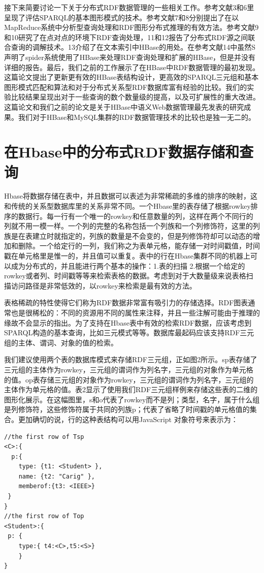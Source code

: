  
  接下来简要讨论一下关于分布式RDF数据管理的一些相关工作。参考文献3和6里呈现了评估SPARQL的基本图形模式的技术。参考文献7和8分别提出了在以MapReduce系统中分析型查询处理和RDF图形分布式推理的有效方法。参考文献9和10研究了在点对点的环境下RDF查询处理，11和12报告了分布式RDF源之间联合查询的调解技术。13介绍了在文本索引中HBase的用处。在参考文献14中虽然S声明了spider系统使用了HBase来处理RDF查询处理和扩展的HBase，但是并没有详细的报告。最后，我们之前的工作展示了在HBase中RDF数据管理的最初发现。这篇论文提出了更新更有效的HBase表结构设计，更高效的SPARQL三元组和基本图形模式匹配和算法和对于分布式关系型RDF数据库富有经验的比较。我们的实验比较结果呈现出对于一些查询的数个数量级的提高，以及可扩展性的重大改进。这篇论文和我们之前的论文是关于HBase中语义Web数据管理最先发表的研究成果。我们对于HBase和MySQL集群的RDF数据管理技术的比较也是独一无二的。 

\section*{在Hbase中的分布式RDF数据存储和查询}
  Hbase将数据存储在表中，并且数据可以表述为非常稀疏的多维的排序的映射，这和传统的关系型数据库里的关系非常不同。一个Hbase里的表存储了根据rowkey排序的数据行。每一行有一个唯一的rowkey和任意数量的列，这样在两个不同行的列就不用一模一样。一个列的完整的名称包括一个列族和一个列修饰符，这里的列族是在表建立时就指定的，列族的数量是不会变的，但是列修饰符却可以动态的增加和删除。一个给定行的一列，我们称之为表单元格，能存储一对时间戳值，时间戳在单元格里是惟一的，并且值可以重复。表中的行在Hbase集群不同的机器上可以成为分布式的，并且能进行两个基本的操作：1.表的扫描 2.根据一个给定的rowkey或者列、时间戳等等来检索表格的数据。考虑到对于大数量级来说表格扫描访问路径是非常低效的，以rowkey来检索是最有效的方法。

  
  表格稀疏的特性使得它们称为RDF数据非常富有吸引力的存储选择。RDF图表通常也是很稀松的：不同的资源用不同的属性来注释，并且一些注解可能由于推理的缘故不会显示的指出。为了支持在Hbase表中有效的检索RDF数据，应该考虑到SPARQL构造的基本查询，比如三元模式等等。数据库最起码应该支持RDF三元组的主体、谓词、对象的值的检索。


  我们建议使用两个表的数据库模式来存储RDF三元组，正如图2所示。sp表存储了三元组的主体作为rowkey，三元组的谓词作为列名字，三元组的对象作为单元格的值。op表存储三元组的对象作为rowkey，三元组的谓词作为列名字，三元组的主体作为单元格的值。表2显示了使用我们RDF三元组样例来存储这些表的二维的图形化展示。在这幅图里，s和o代表了rowkey而不是列；类型，名字，属于什么组是列修饰符，这些修饰符属于共同的列族p；{}代表了省略了时间戳的单元格值的集合。更加确切的说，行的这种表结构可以用JavaScript 对象符号来表示为：
\begin{lstlisting}
//the first row of Tsp
<C>:{
  p:{
	type: {t1: <Student> },
	name: {t2: "Carig" },
	memberof:{t3: <IEEE>}
 }
}
//the first row of Top
<Student>:{
 p: {
	type:{ t4:<C>,t5:<S>}
	}
}
\end{lstlisting}

